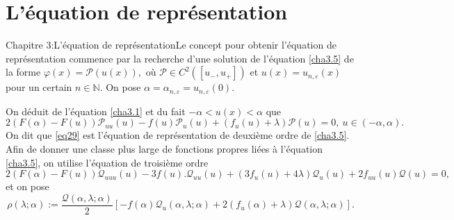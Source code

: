 \documentclass[mathserif,10pt]{beamer}
\begin{document}
\section{ L'équation de représentation}
\begin{frame}{}\transglitter[duration=1]
\begin{center}
\end{center}
\end{frame}
\begin{frame}{Chapitre 3:L'équation de représentation}\transglitter[duration=1]
Le concept pour obtenir l'équation de représentation commence par la recherche d'une solution de l'équation \eqref{cha3.5} 
de la forme $\varphi (x)=\mathcal{P}(u(x)),$ où $\mathcal{P} \in C^{2}([u_{-},u_{+}])$ et $u(x)=u_{n,\varepsilon }(x)$ pour un certain $n\in \mathbb{N}.$ 
On pose $\alpha=\alpha_{n,\varepsilon }=u_{n,\varepsilon}(0).$

On déduit de l'équation \eqref{cha3.1} et du fait $-\alpha < u(x) <\alpha$ que
\begin{equation}\label{eq29}
2(F(\alpha )-F(u))\mathcal{P}_{uu}(u)-f(u)\mathcal{P}_{u}(u)+(f_{u}(u)+\lambda )\mathcal{P}(u)=0,\ u\in (-\alpha ,\alpha ).
\end{equation}
On dit que  \eqref{eq29} est l'équation de représentation 
de deuxième ordre de \eqref{cha3.5}.\\ \pause
Afin de donner une classe plus large de fonctions propres liées à l'équation \eqref{cha3.5}, on utilise l'équation de troisième ordre 
\pause
\begin{equation}\label{eq30}
2(F(\alpha)-F(u))\mathcal{Q}_{uuu}(u)-3f(u ).\mathcal{Q}_{uu}(u)+(3f_{u}(u)+4\lambda )\mathcal{Q}_{u}(u)+2f_{uu}(u)\mathcal{Q} (u)=0,
\end{equation}
et on pose 
\begin{equation}\label{eq32}
\rho (\lambda;\alpha ):=\frac{\mathcal{Q}(\alpha ,\lambda ; \alpha )}{2}\left[-f(\alpha )\mathcal{Q}_{u}(\alpha ,\lambda ; \alpha )+2(f_{u}(\alpha )+\lambda )\mathcal{Q}(\alpha ,\lambda ; \alpha )\right].
\end{equation}
\end{frame}
\end{document}
